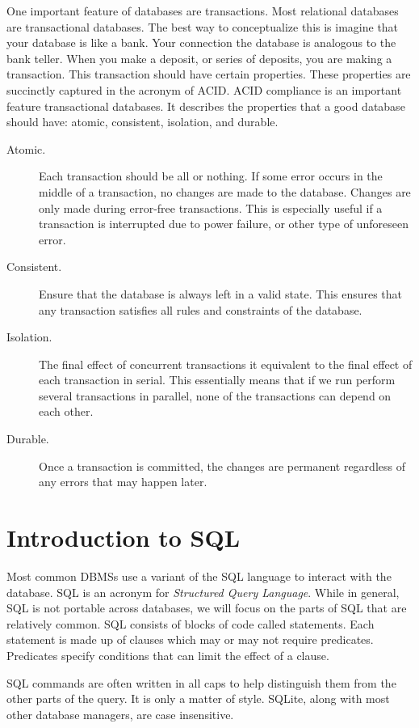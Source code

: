 One important feature of databases are transactions.
Most relational databases are transactional databases.
The best way to conceptualize this is imagine that your database is like a bank.
Your connection the database is analogous to the bank teller.
When you make a deposit, or series of deposits, you are making a transaction.
This transaction should have certain properties.
These properties are succinctly captured in the acronym of ACID.
ACID compliance is an important feature transactional databases.
It describes the properties that a good database should have: atomic, consistent, isolation, and durable.
\begin{description}
\item[Atomic.] Each transaction should be all or nothing.  If some error occurs in the middle of a transaction, no changes are made to the database.  Changes are only made during error-free transactions.  This is especially useful if a transaction is interrupted due to power failure, or other type of unforeseen error.
\item[Consistent.] Ensure that the database is always left in a valid state.  This ensures that any transaction satisfies all rules and constraints of the database.
\item[Isolation.] The final effect of concurrent transactions it equivalent to the final effect of each transaction in serial.  This essentially means that if we run perform several transactions in parallel, none of the transactions can depend on each other.
\item[Durable.] Once a transaction is committed, the changes are permanent regardless of any errors that may happen later.
\end{description}

\section*{Introduction to SQL}
Most common DBMSs use a variant of the SQL language to interact with the database.
SQL is an acronym for \emph{Structured Query Language}.
While in general, SQL is not portable across databases, we will focus on the parts of SQL that are relatively common.
SQL consists of blocks of code called statements.
Each statement is made up of clauses which may or may not require predicates.
Predicates specify conditions that can limit the effect of a clause.

\begin{info}
SQL commands are often written in all caps to help distinguish them from the other parts of the query.
It is only a matter of style.
SQLite, along with most other database managers, are case insensitive.
\end{info}

